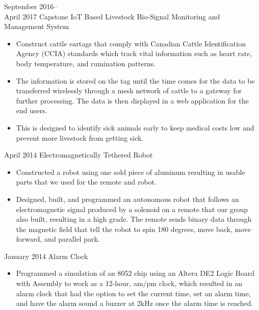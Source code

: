 \documentclass[]{friggeri-cv} %
\begin{document}
\begin{entrylist}

\entry
{September 2016--\\April 2017}
{Capstone {\normalfont IoT Based Livestock Bio-Signal Monitoring and Management System}}
{}
{
\begin{itemize}
\item Construct cattle eartags that comply with Canadian Cattle Identification
Agency (CCIA) standards which track vital information such as heart rate, body
temperature, and rumination patterns.
\item The information is stored on the tag until the time comes for the
data to be transferred wirelessly through a mesh network of cattle to a gateway
for further processing. The data is then displayed in a web application for the
end users.
\item This is designed to identify sick animals early to keep medical costs low
and prevent more livestock from getting sick.
\end{itemize}
}
\entry
{April 2014}
{Electromagnetically Tethered Robot}
{}
{
\begin{itemize}
\item Constructed a robot using one sold piece of aluminum resulting in usable
parts that we used for the remote and robot.
\item Designed, built, and programmed an autonomous robot that follows an
electromagnetic signal produced by a
solenoid on a remote that our group also built, resulting in a high grade. The
remote sends binary data through
the magnetic field that tell the robot to spin 180 degrees, move back, move
forward, and parallel park.
\end{itemize}
}
\entry
{January 2014}
{Alarm Clock}
{}
{
\begin{itemize}
\item Programmed a simulation of an 8052 chip using an Altera DE2 Logic Board
with Assembly to work as a 12-hour, am/pm clock, which resulted in an alarm
clock that had the option to set the current time, set an alarm time, and have
the alarm sound a buzzer at 2kHz once the alarm time is reached.
\end{itemize}
}
\end{entrylist}
\end{document}
